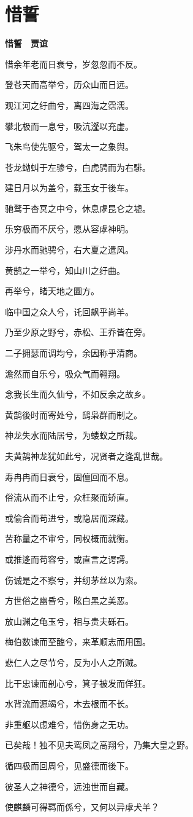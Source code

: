 \documentclass[12pt,a4paper]{ctexbook}
\begin{document}
\section{惜誓}
\textbf{惜誓　贾谊}\par\vspace{0.5em}
惜余年老而日衰兮，岁忽忽而不反。\par
登苍天而高举兮，历众山而日远。\par
观江河之纡曲兮，离四海之霑濡。\par
攀北极而一息兮，吸沆瀣以充虚。\par
飞朱鸟使先驱兮，驾太一之象舆。\par
苍龙蚴虯于左骖兮，白虎骋而为右騑。\par
建日月以为盖兮，载玉女于後车。\par
驰骛于杳冥之中兮，休息虖昆仑之墟。\par
乐穷极而不厌兮，愿从容虖神明。\par
涉丹水而驰骋兮，右大夏之遗风。\par
黄鹄之一举兮，知山川之纡曲。\par
再举兮，睹天地之圜方。\par
临中国之众人兮，讬回飙乎尚羊。\par
乃至少原之野兮，赤松、王乔皆在旁。\par
二子拥瑟而调均兮，余因称乎清商。\par
澹然而自乐兮，吸众气而翱翔。\par
念我长生而久仙兮，不如反余之故乡。\par
黄鹄後时而寄处兮，鸱枭群而制之。\par
神龙失水而陆居兮，为蝼蚁之所裁。\par
夫黄鹄神龙犹如此兮，况贤者之逢乱世哉。\par
寿冉冉而日衰兮，固儃回而不息。\par
俗流从而不止兮，众枉聚而矫直。\par
或偷合而苟进兮，或隐居而深藏。\par
苦称量之不审兮，同权概而就衡。\par
或推迻而苟容兮，或直言之谔謣。\par
伤诚是之不察兮，并纫茅丝以为索。\par
方世俗之幽昏兮，眩白黑之美恶。\par
放山渊之龟玉兮，相与贵夫砾石。\par
梅伯数谏而至醢兮，来革顺志而用国。\par
悲仁人之尽节兮，反为小人之所贼。\par
比干忠谏而剖心兮，箕子被发而佯狂。\par
水背流而源竭兮，木去根而不长。\par
非重躯以虑难兮，惜伤身之无功。\par
已矣哉！独不见夫鸾凤之高翔兮，乃集大皇之野。\par
循四极而回周兮，见盛德而後下。\par
彼圣人之神德兮，远浊世而自藏。\par
使麒麟可得羁而係兮，又何以异虖犬羊？\par
\end{document}
